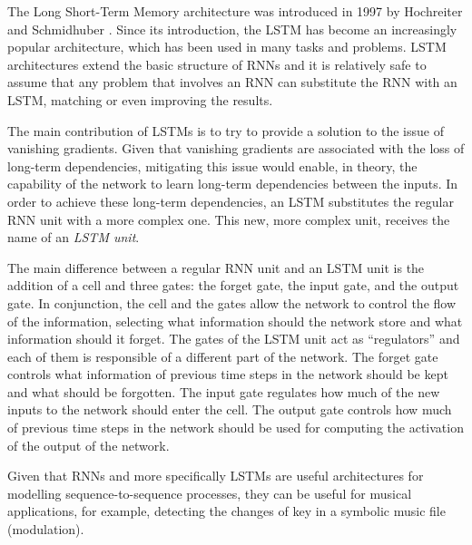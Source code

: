 The Long Short-Term Memory architecture was introduced in
1997 by Hochreiter and Schmidhuber
\cite{hochreiter1997long}. Since its introduction, the LSTM
has become an increasingly popular architecture, which has
been used in many tasks and problems. LSTM architectures
extend the basic structure of RNNs and it is relatively safe
to assume that any problem that involves an RNN can
substitute the RNN with an LSTM, matching or even improving
the results.

The main contribution of LSTMs is to try to provide a
solution to the issue of vanishing gradients. Given that
vanishing gradients are associated with the loss of
long-term dependencies, mitigating this issue would enable,
in theory, the capability of the network to learn long-term
dependencies between the inputs. In order to achieve these
long-term dependencies, an LSTM substitutes the regular RNN
unit with a more complex one. This new, more complex unit,
receives the name of an \emph{LSTM unit}.

The main difference between a regular RNN unit and an LSTM
unit is the addition of a cell and three gates: the forget
gate, the input gate, and the output gate. In conjunction,
the cell and the gates allow the network to control the flow
of the information, selecting what information should the
network store and what information should it forget. The
gates of the LSTM unit act as ``regulators'' and each of
them is responsible of a different part of the network. The
forget gate controls what information of previous time steps
in the network should be kept and what should be forgotten.
The input gate regulates how much of the new inputs to the
network should enter the cell. The output gate controls how
much of previous time steps in the network should be used
for computing the activation of the output of the network.

Given that RNNs and more specifically LSTMs are useful
architectures for modelling sequence-to-sequence processes,
they can be useful for musical applications, for example,
detecting the changes of key in a symbolic music file
(modulation).



